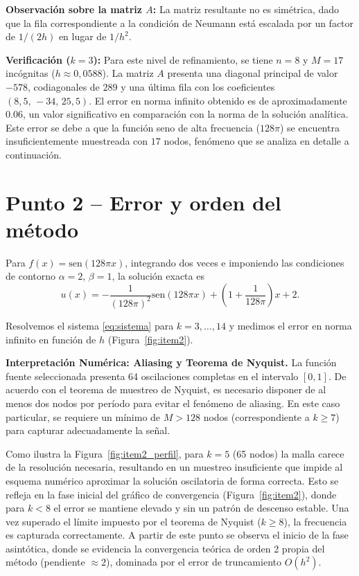 \documentclass[]{report}
\begin{document}
\textbf{Observación sobre la matriz $A$:} La matriz resultante no es simétrica, dado que la fila correspondiente a la condición de Neumann está escalada por un factor de $1/(2h)$ en lugar de $1/h^2$.

\textbf{Verificación ($k=3$):} Para este nivel de refinamiento, se tiene $n=8$ y $M=17$ incógnitas ($h\approx0{,}0588$). La matriz $A$ presenta una diagonal principal de valor $-578$, codiagonales de $289$ y una última fila con los coeficientes $(8{,}5,\,-34,\,25{,}5)$. El error en norma infinito obtenido es de aproximadamente $0.06$, un valor significativo en comparación con la norma de la solución analítica. Este error se debe a que la función seno de alta frecuencia ($128\pi$) se encuentra insuficientemente muestreada con $17$ nodos, fenómeno que se analiza en detalle a continuación.

\section*{Punto 2 -- Error y orden del método}

Para $f(x)=\text{sen}(128\pi x)$, integrando dos veces e imponiendo las condiciones de contorno $\alpha=2$, $\beta=1$, la solución exacta es
\begin{equation}
u(x) = -\frac{1}{(128\pi)^2} \text{sen}(128\pi x) + \left(1 + \frac{1}{128\pi}\right)x + 2 .
\end{equation}

Resolvemos el sistema \eqref{eq:sistema} para $k=3,\dots,14$ y medimos el error en norma infinito en función de $h$ (Figura~\ref{fig:item2}).

\textbf{Interpretación Numérica: Aliasing y Teorema de Nyquist.} La función fuente seleccionada presenta 64 oscilaciones completas en el intervalo $[0,1]$. De acuerdo con el teorema de muestreo de Nyquist, es necesario disponer de al menos dos nodos por período para evitar el fenómeno de aliasing. En este caso particular, se requiere un mínimo de $M > 128$ nodos (correspondiente a $k \ge 7$) para capturar adecuadamente la señal.

Como ilustra la Figura~\ref{fig:item2_perfil}, para $k=5$ (65 nodos) la malla carece de la resolución necesaria, resultando en un muestreo insuficiente que impide al esquema numérico aproximar la solución oscilatoria de forma correcta. Esto se refleja en la fase inicial del gráfico de convergencia (Figura~\ref{fig:item2}), donde para $k < 8$ el error se mantiene elevado y sin un patrón de descenso estable. Una vez superado el límite impuesto por el teorema de Nyquist ($k \ge 8$), la frecuencia es capturada correctamente. A partir de este punto se observa el inicio de la fase asintótica, donde se evidencia la convergencia teórica de orden 2 propia del método (pendiente $\approx 2$), dominada por el error de truncamiento $O(h^2)$.
\end{document}
